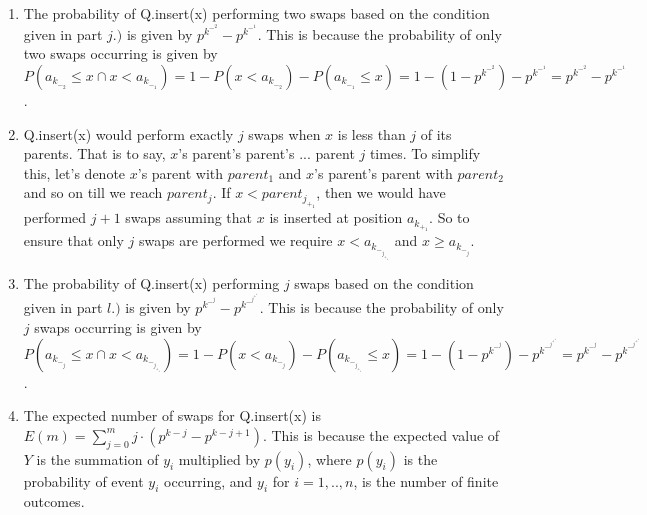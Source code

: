 \documentclass{article}
\begin{document}
\begin{enumerate}[label=(\alph*)]
\item The probability of Q.insert(x) performing two swaps based on the condition given in part $j.)$ is given by $p^k^-^2 - p^k^-^1$. This is because the probability of only two swaps occurring is given by $P(a_k_-_2 \leq x \cap x < a_k_-_1) = 1 - P(x < a_k_-_2) - P(a_k_-_1 \leq x) = 1 - (1 - p^k^-^2) - p^k^-^1 = p^k^-^2 - p^k^-^1$.

\item Q.insert(x) would perform  exactly $j$ swaps when $x$ is less than $j$ of its parents. That is to say, $x$'s parent's parent's ... parent $j$ times. To simplify this, let's denote $x$'s parent with $parent_1$ and $x$'s parent's parent with $parent_2$ and so on till we reach $parent_j$. If $x < parent_j_+_1$, then we would have performed $j+1$ swaps assuming that $x$ is inserted at position $a_k_+_1$. So to ensure that only $j$ swaps are performed we require $x < a_k_-_j_+_1$ and $x \geq a_k_-_j$.  

\item The probability of Q.insert(x) performing $j$ swaps based on the condition given in part $l.)$ is given by $p^k^-^j - p^k^-^j^+^1$. This is because the probability of only $j$ swaps occurring is given by $P(a_k_-_j \leq x \cap x < a_k_-_j_+_1) = 1 - P(x < a_k_-_j) - P(a_k_-_j_+_1 \leq x) = 1 - (1 - p^k^-^j) - p^k^-^j^+^1 = p^k^-^j - p^k^-^j^+^1$. 

\item The expected number of swaps for Q.insert(x) is $E(m) = \sum_{j=0}^{m} j \cdot (p^{k-j} -p^{k-j+1})$. This is because the expected value of $Y$ is the summation of $y_i$ multiplied by $p(y_i)$, where $p(y_i)$ is the probability of event $y_i$ occurring, and $y_i$ for $i = 1,..,n$, is the number of finite outcomes. 

\end{enumerate}
\end{document}
